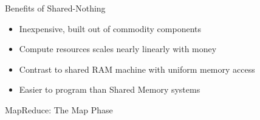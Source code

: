\documentclass[aspectratio=169]{beamer}
\begin{document}
\begin{frame}{Benefits of Shared-Nothing}

\begin{itemize}
        \item Inexpensive, built out of commodity components
	\item Compute resources scales nearly linearly with money
        \item Contrast to shared RAM machine with uniform memory access
        \item Easier to program than Shared Memory systems
\end{itemize}
\end{frame}
\begin{frame}{MapReduce: The Map Phase}


\end{frame}
\end{document}
